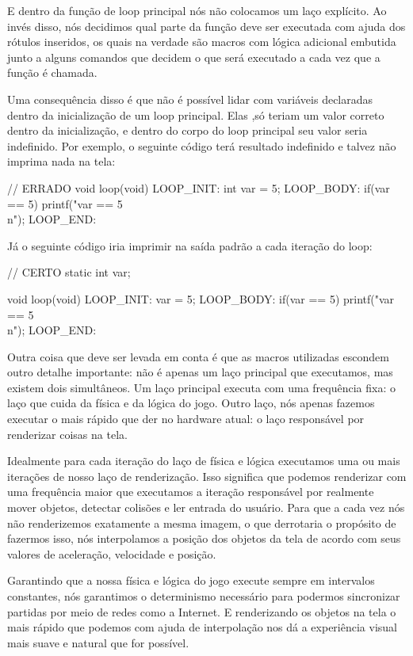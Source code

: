 E dentro da função de loop principal nós não colocamos um laço
explícito. Ao invés disso, nós decidimos qual parte da função deve ser
executada com ajuda dos rótulos inseridos, os quais na verdade são
macros com lógica adicional embutida junto a alguns
comandos  que decidem o que será executado a cada vez
que a função é chamada.

Uma consequência disso é que não é possível lidar com variáveis
declaradas dentro da inicialização de um loop principal. Elas ,só
teriam um valor correto dentro da inicialização, e dentro do corpo do
loop principal seu valor seria indefinido. Por exemplo, o seguinte
código terá resultado indefinido e talvez não imprima nada na tela:

\alinhaverbatim
// ERRADO
void loop(void){
LOOP\_INIT:
  int var = 5;
LOOP\_BODY:
  if(var == 5)
    printf("var == 5\\n");
LOOP\_END:
}
\alinhanormal

Já o seguinte código iria imprimir na saída padrão a cada iteração do
loop:

\alinhaverbatim
// CERTO
static int var;

void loop(void){
LOOP\_INIT:
  var = 5;
LOOP\_BODY:
  if(var == 5)
    printf("var == 5\\n");
LOOP\_END:
}
\alinhanormal

Outra coisa que deve ser levada em conta é que as macros utilizadas
escondem outro detalhe importante: não é apenas um laço principal que
executamos, mas existem dois simultâneos. Um laço principal executa
com uma frequência fixa: o laço que cuida da física e da lógica do
jogo. Outro laço, nós apenas fazemos executar o mais rápido que der no
hardware atual: o laço responsável por renderizar coisas na tela.

Idealmente para cada iteração do laço de física e lógica executamos uma
ou mais iterações de nosso laço de renderização. Isso significa que
podemos renderizar com uma frequência maior que executamos a iteração
responsável por realmente mover objetos, detectar colisões e ler
entrada do usuário. Para que a cada vez nós não renderizemos
exatamente a mesma imagem, o que derrotaria o propósito de fazermos
isso, nós interpolamos a posição dos objetos da tela de acordo com
seus valores de aceleração, velocidade e posição.

Garantindo que a nossa física e lógica do jogo execute sempre em
intervalos constantes, nós garantimos o determinismo necessário para
podermos sincronizar partidas por meio de redes como a Internet. E
renderizando os objetos na tela o mais rápido que podemos com ajuda de
interpolação nos dá a experiência visual mais suave e natural que for
possível.

